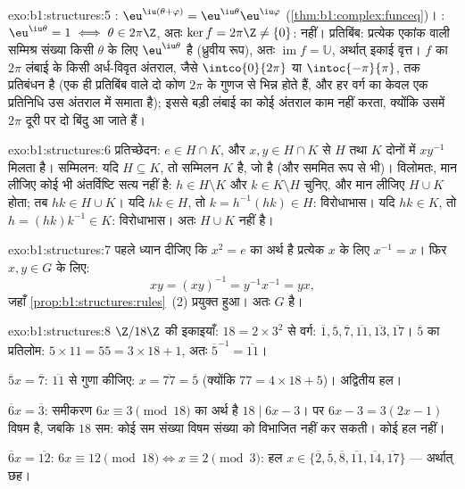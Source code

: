 \begin{solution}{exo:b1:structures:5}
: $\eu^{\iu(\theta + \varphi)} = \eu^{\iu\theta}\eu^{\iu\varphi}$
(\cref{thm:b1:complex:funceq})। : $\eu^{\iu\theta} = 1 \iff \theta \in
2\pi\Z$, अतः $\ker f = 2\pi\Z \neq \{0\}$:  नहीं। प्रतिबिंब: प्रत्येक
एकांक  वाली सम्मिश्र संख्या किसी $\theta$ के लिए $\eu^{\iu\theta}$ है
(ध्रुवीय रूप), अतः $\operatorname{im} f = \mathbb{U}$, अर्थात् इकाई वृत्त।
$f$ का $2\pi$ लंबाई के किसी अर्ध-विवृत अंतराल, जैसे $\intco{0}{2\pi}$ या
$\intoc{-\pi}{\pi}$, तक प्रतिबंधन  है (एक ही प्रतिबिंब वाले दो कोण
$2\pi$ के गुणज से भिन्न होते हैं, और हर वर्ग का केवल एक प्रतिनिधि उस अंतराल
में समाता है); इससे बड़ी लंबाई का कोई अंतराल काम नहीं करता, क्योंकि उसमें
$2\pi$ दूरी पर दो बिंदु आ जाते हैं।
\end{solution}

\begin{solution}{exo:b1:structures:6}
प्रतिच्छेदन: $e \in H \cap K$, और $x, y \in H \cap K$ से $H$ तथा $K$ दोनों
में $xy^{-1}$ मिलता है। सम्मिलन: यदि $H \subseteq K$, तो सम्मिलन $K$ है, जो
 है (और सममित रूप से भी)। विलोमतः, मान लीजिए कोई भी अंतर्विष्टि सत्य
नहीं है: $h \in H \setminus K$ और $k \in K \setminus H$ चुनिए, और मान लीजिए
$H \cup K$  होता; तब $hk \in H \cup K$। यदि $hk \in H$, तो $k =
h^{-1}(hk) \in H$: विरोधाभास। यदि $hk \in K$, तो $h = (hk)k^{-1} \in K$:
विरोधाभास। अतः $H \cup K$  नहीं है।
\end{solution}

\begin{solution}{exo:b1:structures:7}
पहले ध्यान दीजिए कि $x^2 = e$ का अर्थ है प्रत्येक $x$ के लिए $x^{-1} = x$।
फिर $x, y \in G$ के लिए:
\[
xy = (xy)^{-1} = y^{-1} x^{-1} = yx ,
\]
जहाँ \cref{prop:b1:structures:rules}~(2) प्रयुक्त हुआ। अतः $G$  है।
\end{solution}

\begin{solution}{exo:b1:structures:8}
$\Z/18\Z$ की इकाइयाँ: $18 = 2 \times 3^2$ से  वर्ग: $\overline 1,
\overline 5, \overline 7, \overline{11}, \overline{13}, \overline{17}$।
$\overline 5$ का प्रतिलोम: $5 \times 11 = 55 = 3\times 18 + 1$, अतः
$\overline 5^{-1} = \overline{11}$।

$\overline 5 x = \overline 7$: $\overline{11}$ से गुणा कीजिए: $x =
\overline{77} = \overline 5$ (क्योंकि $77 = 4\times 18 + 5$)। अद्वितीय हल।

$\overline 6 x = \overline 3$: समीकरण $6x \equiv 3 \pmod{18}$ का अर्थ है $18
\mid 6x - 3$। पर $6x - 3 = 3(2x - 1)$ विषम है, जबकि $18$ सम: कोई सम संख्या
विषम संख्या को विभाजित नहीं कर सकती। कोई हल नहीं।

$\overline 6 x = \overline{12}$: $6x \equiv 12 \pmod{18} \iff x \equiv 2
\pmod 3$: हल $x \in \{\overline 2, \overline 5, \overline 8, \overline{11},
\overline{14}, \overline{17}\}$ --- अर्थात् छह।
\end{solution}

